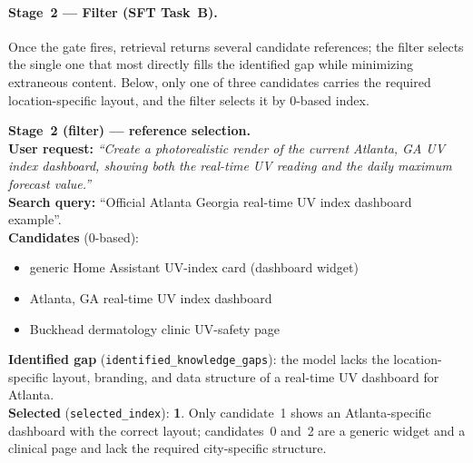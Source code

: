\bigskip

\paragraph{Stage~2 --- Filter (SFT Task~B).}
Once the gate fires, retrieval returns several candidate references; the filter selects
the single one that most directly fills the identified gap while minimizing extraneous
content. Below, only one of three candidates carries the required location-specific
layout, and the filter selects it by 0-based index.

\begin{examplebox}
\small
\textbf{Stage~2 (filter) --- reference selection.}\\[2pt]
\textbf{User request:} \emph{``Create a photorealistic render of the current Atlanta, GA UV index dashboard, showing both the real-time UV reading and the daily maximum forecast value.''}\\[2pt]
\textbf{Search query:} ``Official Atlanta Georgia real-time UV index dashboard example''.\\[3pt]
\textbf{Candidates} (0-based):
\begin{itemize}[leftmargin=1.2em,itemsep=1pt,topsep=1pt,parsep=0pt]
  \item[0.] generic Home Assistant UV-index card (dashboard widget)
  \item[1.] Atlanta, GA real-time UV index dashboard
  \item[2.] Buckhead dermatology clinic UV-safety page
\end{itemize}
\vspace{1pt}
\textbf{Identified gap} (\texttt{identified\_knowledge\_gaps}): the model lacks the location-specific layout, branding, and data structure of a real-time UV dashboard for Atlanta.\\[2pt]
\textbf{Selected} (\texttt{selected\_index}): \textbf{1}. Only candidate~1 shows an Atlanta-specific dashboard with the correct layout; candidates~0 and~2 are a generic widget and a clinical page and lack the required city-specific structure.
\end{examplebox}

\bigskip

